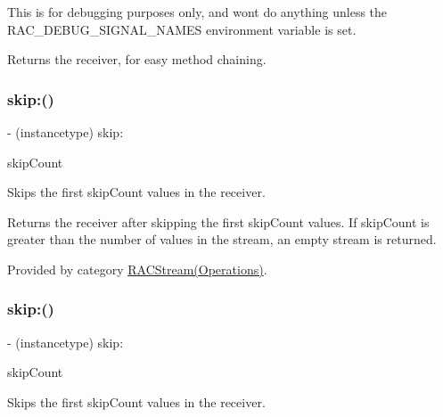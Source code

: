 This is for debugging purposes only, and won\textquotesingle{}t do anything unless the R\+A\+C\+\_\+\+D\+E\+B\+U\+G\+\_\+\+S\+I\+G\+N\+A\+L\+\_\+\+N\+A\+M\+ES environment variable is set.

Returns the receiver, for easy method chaining. \mbox{\label{interface_r_a_c_stream_a1525f1607d8ff7f04a0afc1a5193436a}} 
\subsubsection{\texorpdfstring{skip\+:()}{skip:()}\hspace{0.1cm}{\footnotesize\ttfamily [1/3]}}
{\footnotesize\ttfamily -\/ (instancetype) skip\+: \begin{DoxyParamCaption}\item[{(N\+S\+U\+Integer)}]{skip\+Count }\end{DoxyParamCaption}}

Skips the first {\ttfamily skip\+Count} values in the receiver.

Returns the receiver after skipping the first {\ttfamily skip\+Count} values. If {\ttfamily skip\+Count} is greater than the number of values in the stream, an empty stream is returned. 

Provided by category \mbox{\hyperlink{category_r_a_c_stream_07_operations_08_a1525f1607d8ff7f04a0afc1a5193436a}{R\+A\+C\+Stream(\+Operations)}}.

\mbox{\label{interface_r_a_c_stream_a1525f1607d8ff7f04a0afc1a5193436a}} 
\subsubsection{\texorpdfstring{skip\+:()}{skip:()}\hspace{0.1cm}{\footnotesize\ttfamily [2/3]}}
{\footnotesize\ttfamily -\/ (instancetype) skip\+: \begin{DoxyParamCaption}\item[{(N\+S\+U\+Integer)}]{skip\+Count }\end{DoxyParamCaption}}

Skips the first {\ttfamily skip\+Count} values in the receiver.

